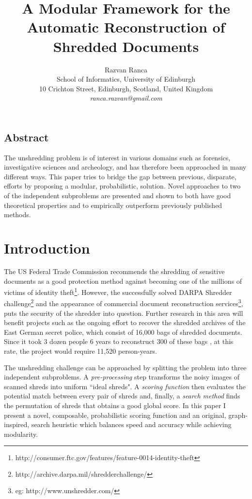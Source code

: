 \documentclass[letterpaper]{article}
\title{A Modular Framework for the Automatic Reconstruction of Shredded Documents}
\author{Razvan Ranca\\
School of Informatics, University of Edinburgh\\
10 Crichton Street, Edinburgh, Scotland, United Kingdom\\
\emph{ranca.razvan@gmail.com}
}
\begin{document}
\maketitle

\begin{adjustwidth}{10pt}{10pt}
\section{
\fontsize{10pt}{12pt} 
\selectfont 
Abstract}

\fontsize{9pt}{10pt}
\selectfont
The unshredding problem is of interest in various domains such as forensics, investigative sciences and  archeology, and has therefore been approached in many different ways. This paper tries to bridge the gap between previous, disparate, efforts by proposing a modular, probabilistic, solution. Novel approaches to two of the independent subproblems are presented and shown to both have good theoretical properties and to empirically outperform previously published methods.
\end{adjustwidth}

\section{
\fontsize{12pt}{15pt} 
\selectfont
Introduction}
\fontsize{10pt}{12pt} 
\selectfont
The US Federal Trade Commission recommends the shredding of sensitive documents as a good protection method against becoming one of the millions of victims of identity theft\footnote{http://consumer.ftc.gov/features/feature-0014-identity-theft}. However, the successfully solved DARPA Shredder challenge\footnote{http://archive.darpa.mil/shredderchallenge/} and the appearance of commercial document reconstruction services\footnote{eg: http://www.unshredder.com/}, puts the security of the shredder into question. Further research in this area will benefit projects such as the ongoing effort to recover the shredded archives of the East German secret police, which consist of 16,000 bags of shredded documents. Since it took 3 dozen people 6 years to reconstruct 300 of these bags \cite{P6}, at this rate, the project would require 11,520 person-years.

The unshredding challenge can be approached by splitting the problem into three independent subproblems. A \emph{pre-processing} step transforms the noisy images of scanned shreds into uniform ``ideal shreds". A \emph{scoring function} then evaluates the potential match between every pair of shreds and, finally, a \emph{search method} finds the permutation of shreds that obtains a good global score. In this paper I present a novel, composable, probabilistic scoring function and an original, graph-inspired, search heuristic which balances speed and accuracy while achieving modularity.
\end{document}
